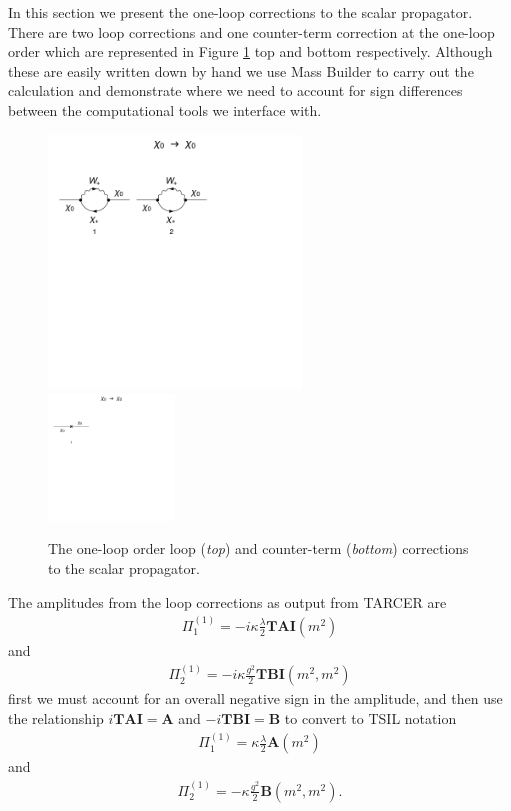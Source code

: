 \documentclass[11pt]{article}
\newcommand{\mb}{\textsf{Mass Builder} \! }
\newcommand{\tsil}{\textsf{TSIL} \! }
\newcommand{\tarcer}{\textsf{TARCER} \! }
\begin{document}
In this section we present the one-loop corrections to the scalar propagator.  There are two loop corrections and one counter-term correction at the one-loop order which are represented in Figure \ref{fig:1loop} top and bottom respectively.  Although these are easily written down by hand we use \mb to carry out the calculation and demonstrate where we need to account for sign differences between the computational tools we interface with.


\begin{figure}[h!]
\center
\includegraphics[width=0.6\textwidth]{1loop.pdf}\\
\includegraphics[width=0.3\textwidth]{1loop_1c.pdf}
\caption{The one-loop order loop (\textit{top}) and counter-term (\textit{bottom}) corrections to the scalar propagator.}\label{fig:1loop}
\end{figure}



The amplitudes from the loop corrections as output from \tarcer are
\begin{align}
\Pi^{(1)}_1 = -i \kappa \frac{\lambda}{2} \mathbf{TAI}(m^2)
\end{align}
and
\begin{align}
\Pi^{(1)}_2 =-i \kappa \frac{g^2}{2} \mathbf{TBI}(m^2,m^2)
\end{align}
first we must account for an overall negative sign in the amplitude, and then use the relationship $i\mathbf{TAI} = \mathbf{A}$ and $-i\mathbf{TBI} = \mathbf{B}$ to convert to \tsil notation
\begin{align}
\Pi^{(1)}_1 = \kappa \frac{\lambda}{2} \mathbf{A}(m^2)
\end{align}
and
\begin{align}
\Pi^{(1)}_2 = -\kappa \frac{g^2}{2} \mathbf{B}(m^2,m^2).
\end{align}
\end{document}
